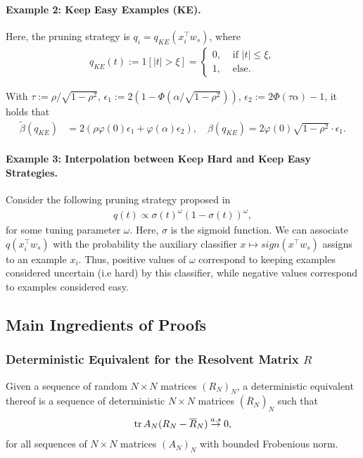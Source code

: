 \paragraph{Example 2: Keep Easy Examples (KE).} Here, the pruning strategy is $q_i = q_{KE}(x_i^\top w_s)$, where
\begin{eqnarray}
 q_{KE}(t) := 1[|t| > \xi] = \begin{cases}
    0,&\mbox{ if }|t| \le \xi,\\
    1,&\mbox{ else.}
\end{cases}
\end{eqnarray}
\begin{lemma}
\label{lm:KE}
With $\tau:=\rho/\sqrt{1-\rho^2}$, $\epsilon_1 := 2(1-\Phi(\alpha/\sqrt{1-\rho^2}))$, $\epsilon_2 := 2\Phi(\tau \alpha)-1$, it holds that
\begin{align}
    \tilde \beta(q_{KE})&= 2(\rho\varphi(0)\epsilon_1+\varphi(\alpha)\epsilon_2),\quad \beta(q_{KE}) = 2\varphi(0)\sqrt{1-\rho^2}\cdot \epsilon_1.
\end{align}
\end{lemma}

\paragraph{Example 3: Interpolation between Keep Hard and Keep Easy Strategies.} Consider the following pruning strategy proposed in \cite{kolossov2024towards}
\begin{eqnarray}
    q(t) \propto \sigma(t)^\omega (1-\sigma(t))^\omega,
\end{eqnarray}
for some tuning parameter $\omega$. Here, $\sigma$ is the sigmoid function. We can associate $q(x_i^\top w_s)$ with the probability the auxiliary classifier $x \mapsto sign(x^\top w_s)$ assigns to an example $x_i$. Thus, positive values of $\omega$ correspond to keeping examples considered uncertain (i.e hard) by this classifier, while negative values correspond to examples considered easy.


\subsection{Main Ingredients of Proofs}
\subsubsection{Deterministic Equivalent for the Resolvent Matrix $R$}
\begin{definition}
    Given a sequence of random $N \times N$ matrices $(R_N)_N$, a deterministic equivalent thereof is a sequence of deterministic  $N \times N$  matrices $(\overline R_N)_N$ such that
    \begin{eqnarray}
    \operatorname{tr} A_N (R_N -\overline R_N) \overset{a.s}{\to} 0,
    \end{eqnarray}
    for all sequences of $N \times N$ matrices $(A_N)_N$ with bounded Frobenious norm.
\end{definition}

